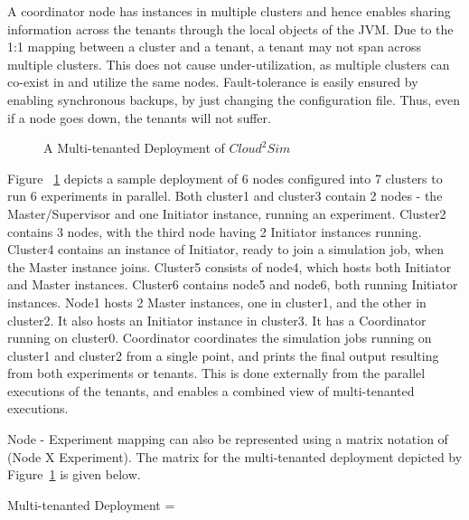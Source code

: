 A coordinator node has instances in multiple clusters and hence enables sharing information across the tenants through the local objects of the JVM. Due to the 1:1 mapping between a cluster and a tenant, a tenant may not span across multiple clusters. This does not cause under-utilization, as multiple clusters can co-exist in and utilize the same nodes. Fault-tolerance is easily ensured by enabling synchronous backups, by just changing the configuration file. Thus, even if a node goes down, the tenants will not suffer.
\begin{figure}[ht]
\begin{center}
\end{center}
 \caption{A Multi-tenanted Deployment of $Cloud^{2}Sim$}
 \label{fig:mapreducecluster}
\end{figure}

Figure ~\ref{fig:mapreducecluster} depicts a sample deployment of 6 nodes configured into 7 clusters to run 6 experiments in parallel. Both cluster1 and cluster3 contain 2 nodes - the Master/Supervisor and one Initiator instance, running an experiment. Cluster2 contains 3 nodes, with the third node having 2 Initiator instances running. Cluster4 contains an instance of Initiator, ready to join a simulation job, when the Master instance joins. Cluster5 consists of node4, which hosts both Initiator and Master instances. Cluster6 contains node5 and node6, both running Initiator instances. Node1 hosts 2 Master instances, one in cluster1, and the other in cluster2. It also hosts an Initiator instance in cluster3. It has a Coordinator running on cluster0. Coordinator coordinates the simulation jobs running on cluster1 and cluster2 from a single point, and prints the final output resulting from both experiments or tenants. This is done externally from the parallel executions of the tenants, and enables a combined view of multi-tenanted executions.

Node - Experiment mapping can also be represented using a matrix notation of (Node X Experiment). The matrix for the multi-tenanted deployment depicted by Figure~\ref{fig:mapreducecluster} is given below.

Multi-tenanted Deployment =

